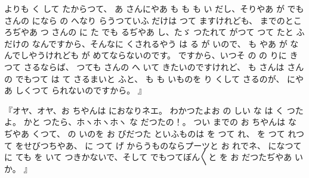 よりも
く
して
たからつて、
あ
さんにやあ
も
も
も
い
だし、そりやあ
が
でも
さんの
になら
の
へなり
らうつていふ
だけは
つて
ますけれども、
までのところぢやあ
つ
さんの
に
た
でも
るぢやあ
し、たゞ
つたれて
がつて
つて
たと
ふだけの
なんですから、そんなに
くされるやう
は
る
が
いので、
も
やあ
が
なんでしやうけれども
が
めてならないのです。
ですから、いつそ
の
の
りに
き
つて
さるならば、
つても
さんの
へ
いて
きたいのですけれど、
も
さんは
さんの
でもつて
は
て
さるまいと
ふと、
も
も
いものを
り
くして
さるのが、
にやあ
しくつて
られないのですから。
』

『オヤ、オヤ、お
ちやんは
におなりネエ。
わかつたよお
の
しい
な
は
く
つたよ。
かと
つたら、ホヽホヽホヽ
な
だつたの！。
つい
までの
お
ちやんは
な
ぢやあ
くつて、
の
いのを
お
びだつた
といふものは
を
つて
れ、
を
つて
れつて
をせびつちやあ、
に
つて
げ
からうものならプーツと
お
れでネ、
になつて
に
ても
を
いて
つきかないで、そして
でもつてぼん〳〵と
を
お
だつたぢやあ
いか。
』

